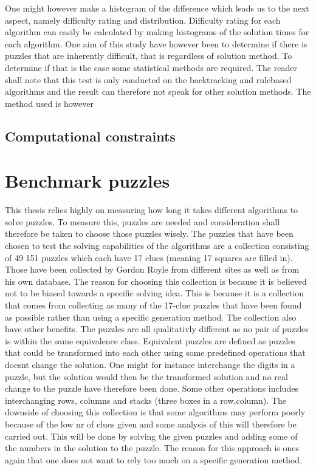 \documentclass[a4paper,11pt]{kth-mag}
\begin{document}
One might however make a histogram of the difference which leads us to the next aspect, namely difficulty rating and distribution. 
Difficulty rating for each algorithm can easily be calculated by making histograms of the solution times for each algorithm. 
One aim of this study have however been to determine if there is puzzles that are inherently difficult, that is regardless of solution method.
To determine if that is the case some statistical methods are required. The reader shall note that this test is only conducted on the backtracking and rulebased algorithms and the result can therefore not speak for other solution methods.
The method used is however  

\newline

\subsection{Computational constraints}


\section{Benchmark puzzles}
This thesis relies highly on measuring how long it takes different algorithms to solve puzzles. 
To measure this, puzzles are needed and consideration shall therefore be taken to choose those puzzles wisely.
The puzzles that have been chosen to test the solving capabilities of the algorithms are a collection consisting of 49 151 puzzles which each have 17 clues (meaning 17 squares are filled in). \cite{database} Those have been collected by Gordon Royle from different sites as well as from his own database.
The reason for choosing this collection is because it is believed not to be biased towards a specific solving idea.
This is because it is a collection that comes from collecting as many of the 17-clue puzzles that have been found as possible rather than using a specific generation method.
The collection also have other benefits.
The puzzles are all qualitativly different as no pair of puzzles is within the same equivalence class.
Equivalent puzzles are defined as puzzles that could be transformed into each other using some predefined operations that doesnt change the solution.
One might for instance interchange the digits in a puzzle, but the solution would then be the transformed solution and no real change to the puzzle have therefore been done.
Some other operations includes interchanging rows, columns and stacks (three boxes in a row,column).
The downside of choosing this collection is that some algorithms may perform poorly because of the low nr of clues given and some analysis of this will therefore be carried out.
This will be done by solving the given puzzles and adding some of the numbers in the solution to the puzzle.
The reason for this approach is ones again that one does not want to rely too much on a specific generation method.
\end{document}

